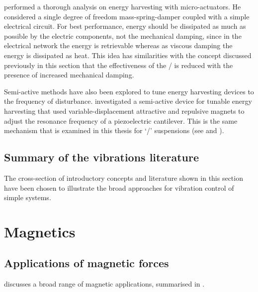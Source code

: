\textcite{stephen2006} performed a thorough analysis on energy harvesting with micro-actuators.
He considered a single degree of freedom mass-spring-damper coupled with a simple electrical circuit.
For best performance, energy should be dissipated as much as possible by the electric components, not the mechanical damping, since in the electrical network the energy is retrievable whereas as viscous damping the energy is dissipated as heat.
This idea has similarities with the concept discussed previously in this section that the effectiveness of the \vibneut/ is reduced with the presence of increased mechanical damping.

Semi-active methods have also been explored to tune energy harvesting devices to the frequency of disturbance.
\textcite{challa2008} investigated a semi-active device for tunable energy harvesting that used variable-displacement attractive and repulsive magnets to adjust the resonance frequency of a piezoelectric cantilever.
This is the same mechanism that is examined in this thesis for `\qzs/' suspensions (see  and ).



\subsection{Summary of the vibrations literature}

The cross-section of introductory concepts and literature shown in this section have been chosen to illustrate the broad approaches for vibration control of simple systems.



\section{Magnetics}


\subsection{Applications of magnetic forces}

\textcite{coey2002} discusses a broad range of magnetic applications,
summarised in .

